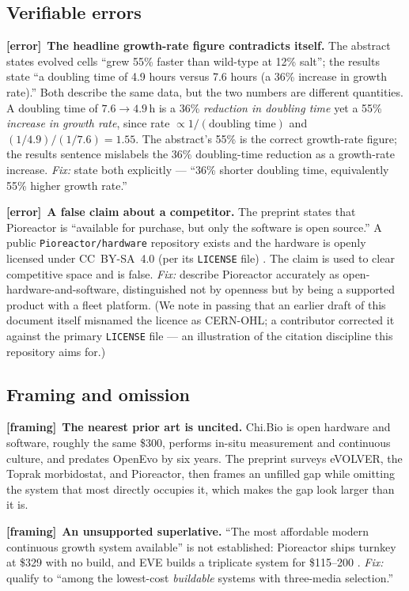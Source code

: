 \documentclass[11pt,a4paper]{article}
\newcommand{\code}[1]{\texttt{\small #1}}
\newcommand{\err}{\textcolor{bad}{\textbf{[error]}}}
\newcommand{\frm}{\textcolor{warn}{\textbf{[framing]}}}
\begin{document}
\subsection{Verifiable errors}

\err\ \textbf{The headline growth-rate figure contradicts itself.} The abstract states
evolved cells ``grew 55\% faster than wild-type at 12\% salt''; the results state ``a doubling
time of 4.9 hours versus 7.6 hours (a 36\% increase in growth rate).'' Both describe the same
data, but the two numbers are different quantities. A doubling time of $7.6 \to 4.9$\,h is a
36\% \emph{reduction in doubling time} yet a 55\% \emph{increase in growth rate}, since rate
$\propto 1/(\text{doubling time})$ and $(1/4.9)/(1/7.6) = 1.55$. The abstract's 55\% is the
correct growth-rate figure; the results sentence mislabels the 36\% doubling-time reduction as
a growth-rate increase. \emph{Fix:} state both explicitly --- ``36\% shorter doubling time,
equivalently 55\% higher growth rate.''

\err\ \textbf{A false claim about a competitor.} The preprint states that Pioreactor is
``available for purchase, but only the software is open source.'' A public
\code{Pioreactor/hardware} repository exists and the hardware is openly licensed under
CC~BY-SA~4.0 (per its \code{LICENSE} file) \cite{pioreactor}. The claim is used to clear
competitive space and is false. \emph{Fix:} describe Pioreactor accurately as
open-hardware-and-software, distinguished not by openness but by being a supported product
with a fleet platform. (We note in passing that an earlier draft of this document itself
misnamed the licence as CERN-OHL; a contributor corrected it against the primary
\code{LICENSE} file --- an illustration of the citation discipline this repository aims for.)

\subsection{Framing and omission}

\frm\ \textbf{The nearest prior art is uncited.} Chi.Bio \cite{steel2020chibio} is open
hardware and software, roughly the same \$300, performs in-situ measurement and continuous
culture, and predates OpenEvo by six years. The preprint surveys eVOLVER, the Toprak
morbidostat, and Pioreactor, then frames an unfilled gap while omitting the system that most
directly occupies it, which makes the gap look larger than it is.

\frm\ \textbf{An unsupported superlative.} ``The most affordable modern continuous growth
system available'' is not established: Pioreactor ships turnkey at \$329 with no build, and EVE
builds a triplicate system for \$115--200 \cite{gopalakrishnan2022eve}. \emph{Fix:} qualify to
``among the lowest-cost \emph{buildable} systems with three-media selection.''
\end{document}

